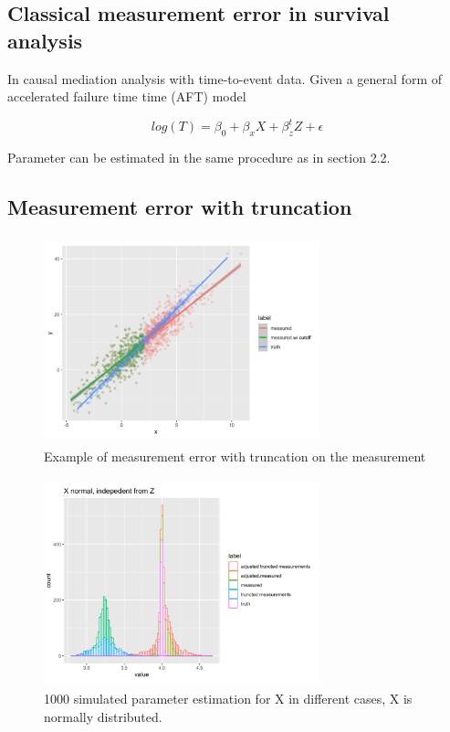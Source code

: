 \documentclass{article}
\begin{document}




\subsection{Classical measurement error in survival analysis}

In causal mediation analysis with time-to-event data.  \cite{vanderweele2011causal} Given a general form of accelerated failure time time  (AFT) model

\begin{equation}
log(T) = \beta_0 + \beta_x   X + \beta_{z}^t Z + \epsilon
\end{equation}


Parameter can be estimated in the same procedure as in section 2.2.



\subsection{Measurement error with truncation}

\begin{figure}[h]
\centering
\includegraphics[width = 8cm,height = 6cm]{figure-2.png}
\caption{Example of measurement error with truncation on the measurement}
\label{fig2}
\end{figure}



\begin{figure}[h]
\centering
\includegraphics[width = 8cm,height = 6cm]{figure-3.png}
\caption{1000 simulated parameter estimation for X in different cases, X is normally distributed. }
\label{fig3}
\end{figure}
\end{document}
